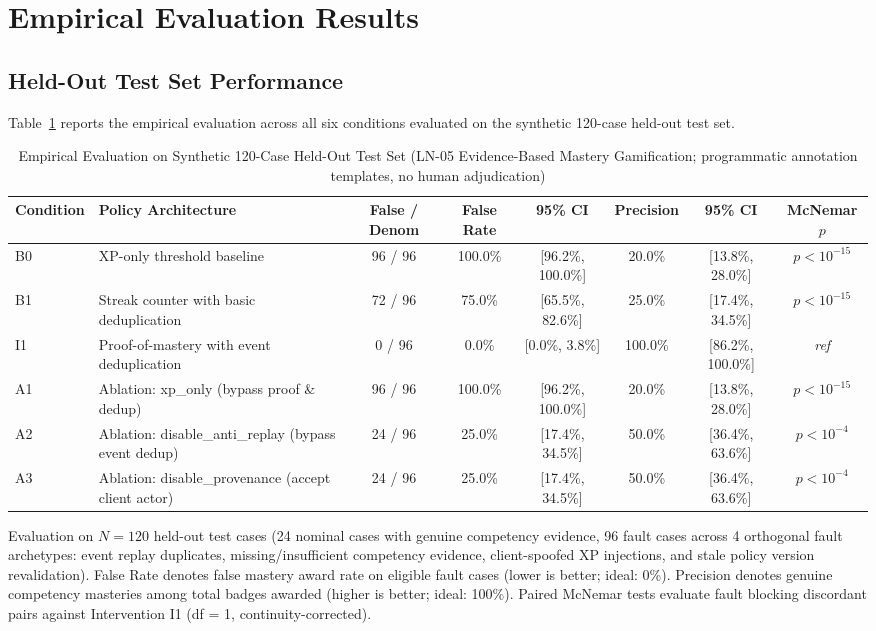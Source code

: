 \documentclass[11pt,a4paper]{article}
\begin{document}
\section{Empirical Evaluation Results}

\subsection{Held-Out Test Set Performance}
Table~\ref{tab:ln-05-holdout-benchmark} reports the empirical evaluation across all six conditions evaluated on the synthetic 120-case held-out test set.

\begin{table}[htbp]
\centering
\small
\caption{Empirical Evaluation on Synthetic 120-Case Held-Out Test Set (LN-05 Evidence-Based Mastery Gamification; programmatic annotation templates, no human adjudication)}
\label{tab:ln-05-holdout-benchmark}
\begin{tabular}{llcccccc}
\toprule
Condition & Policy Architecture & False / Denom & False Rate & 95\% CI & Precision & 95\% CI & McNemar $p$ \\
\midrule
B0 & XP-only threshold baseline & 96 / 96 & 100.0\% & [96.2\%, 100.0\%] & 20.0\% & [13.8\%, 28.0\%] & $p < 10^{-15}$ \\
B1 & Streak counter with basic deduplication & 72 / 96 & 75.0\% & [65.5\%, 82.6\%] & 25.0\% & [17.4\%, 34.5\%] & $p < 10^{-15}$ \\
I1 & Proof-of-mastery with event deduplication & 0 / 96 & 0.0\% & [0.0\%, 3.8\%] & 100.0\% & [86.2\%, 100.0\%] & \textit{ref} \\
A1 & Ablation: xp\_only (bypass proof \& dedup) & 96 / 96 & 100.0\% & [96.2\%, 100.0\%] & 20.0\% & [13.8\%, 28.0\%] & $p < 10^{-15}$ \\
A2 & Ablation: disable\_anti\_replay (bypass event dedup) & 24 / 96 & 25.0\% & [17.4\%, 34.5\%] & 50.0\% & [36.4\%, 63.6\%] & $p < 10^{-4}$ \\
A3 & Ablation: disable\_provenance (accept client actor) & 24 / 96 & 25.0\% & [17.4\%, 34.5\%] & 50.0\% & [36.4\%, 63.6\%] & $p < 10^{-4}$ \\
\bottomrule
\end{tabular}
\par\smallskip
\begin{minipage}{0.98\linewidth}\footnotesize
Evaluation on $N=120$ held-out test cases (24 nominal cases with genuine competency evidence, 96 fault cases across 4 orthogonal fault archetypes: event replay duplicates, missing/insufficient competency evidence, client-spoofed XP injections, and stale policy version revalidation). False Rate denotes false mastery award rate on eligible fault cases (lower is better; ideal: 0\%). Precision denotes genuine competency masteries among total badges awarded (higher is better; ideal: 100\%). Paired McNemar tests evaluate fault blocking discordant pairs against Intervention I1 (df = 1, continuity-corrected).
\end{minipage}
\end{table}
\end{document}
